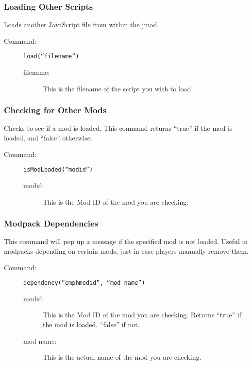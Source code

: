 \documentclass[letterpaper,titlepage,12pt]{article}
\begin{document}
\subsubsection{Loading Other Scripts}

Loads another JavaScript file from within the jmod.

\begin{description}
\item[Command:] \texttt{load(``\emph{filename}'')}
\begin{description}
\item [filename:] This is the filename of the script you wish to load.
\end{description}
\end{description}


\subsubsection{Checking for Other Mods}

Checks to see if a mod is loaded.  This command returns ``true'' if the mod is loaded, and ``false'' otherwise.

\begin{description}
\item[Command:] \texttt{isModLoaded(``\emph{modid}'')}

\begin{description}
\item [modid:] This is the Mod ID of the mod you are checking.
\end{description}
\end{description}

\subsubsection{Modpack Dependencies}

This command will pop up a message if the specified mod is not loaded.  Useful in modpacks depending on certain mods, just in case players manually remove them.

\begin{description}
\item[Command:] \texttt{dependency(``emph{modid}'', ``\emph{mod name}'')}

\begin{description}
\item [modid:] This is the Mod ID of the mod you are checking.  Returns ``true'' if the mod is loaded, ``false'' if not.
\item [mod name:] This is the actual name of the mod you are checking.
\end{description}
\end{description}
\end{document}
